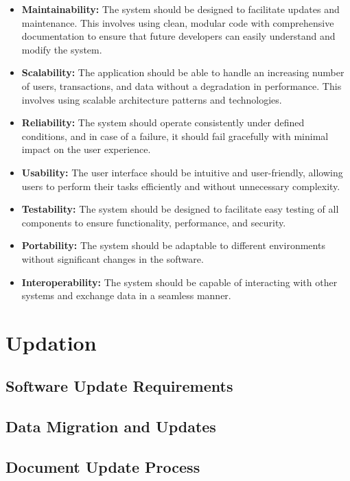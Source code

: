 \documentclass{article}
\begin{document}
\begin{itemize}
    \item \textbf{Maintainability:} The system should be designed to facilitate updates and maintenance. This involves using clean, modular code with comprehensive documentation to ensure that future developers can easily understand and modify the system.

    \item \textbf{Scalability:} The application should be able to handle an increasing number of users, transactions, and data without a degradation in performance. This involves using scalable architecture patterns and technologies.

    \item \textbf{Reliability:} The system should operate consistently under defined conditions, and in case of a failure, it should fail gracefully with minimal impact on the user experience.

    \item \textbf{Usability:} The user interface should be intuitive and user-friendly, allowing users to perform their tasks efficiently and without unnecessary complexity.

    \item \textbf{Testability:} The system should be designed to facilitate easy testing of all components to ensure functionality, performance, and security.

    \item \textbf{Portability:} The system should be adaptable to different environments without significant changes in the software.

    \item \textbf{Interoperability:} The system should be capable of interacting with other systems and exchange data in a seamless manner.
\end{itemize}

\newpage
\section{Updation}
\subsection{Software Update Requirements}

\subsection{Data Migration and Updates}

\subsection{Document Update Process}
\end{document}
